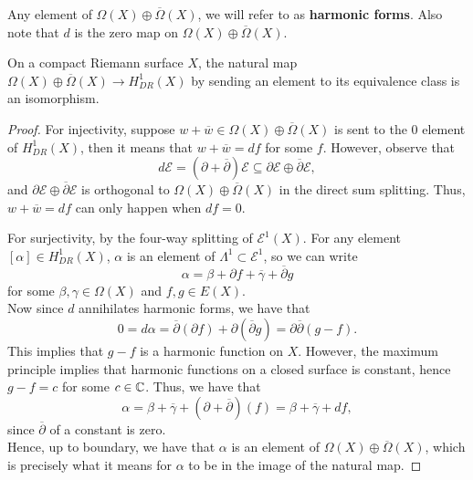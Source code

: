 \documentclass{article}
\begin{document}
{\begin{definition}
Any element of $\Omega(X) \oplus \overline{\Omega}(X)$, we will refer to as \textbf{harmonic forms}. Also note that $d$ is the zero map on $\Omega(X) \oplus \overline{\Omega}(X)$.
\end{definition}

\begin{theorem}
    On a compact Riemann surface $X$, the natural map $\Omega(X) \oplus \overline{\Omega}(X) \to H^1_{DR}(X)$ by sending an element to its equivalence class is an isomorphism.
\end{theorem}

\begin{proof}
    For injectivity, suppose $w + \overline{w} \in \Omega(X) \oplus \overline{\Omega}(X)$ is sent to the $0$ element of $H^1_{DR}(X)$, then it means that $w + \overline{w} = df$ for some $f$. However, observe that
    \[d \mathcal{E} = (\partial + \overline{\partial}) \mathcal{E} \subseteq \partial \mathcal{E} \oplus \overline{\partial } \mathcal{E}, \]
    and $\partial \mathcal{E} \oplus \overline{\partial } \mathcal{E}$ is orthogonal to $\Omega(X) \oplus \overline{\Omega}(X)$ in the direct sum splitting. Thus, $w + \overline{w} = df$ can only happen when $df = 0$.

    For surjectivity, by the four-way splitting of $\mathcal{E}^1(X)$. For any element $[\alpha] \in H^1_{DR}(X)$, $\alpha$ is an element of $\Lambda^1 \subset \mathcal{E}^1$, so we can write
    \[\alpha = \beta + \partial f + \overline{\gamma} + \overline{\partial} g\]
    for some $\beta, \gamma \in \Omega(X)$ and $f, g \in E(X)$.\\

    Now since $d$ annihilates harmonic forms, we have that
    \[0 = d\alpha = \overline{\partial}(\partial f) + \partial(\overline{\partial} g) = \partial \overline{\partial}(g - f). \]
    This implies that $g - f$ is a harmonic function on $X$. However, the maximum principle implies that harmonic functions on a closed surface is constant, hence $g - f = c$ for some $c \in \mathbb{C}$. Thus, we have that
    \[\alpha = \beta + \overline{\gamma} + (\partial + \overline{\partial})(f) = \beta + \overline{\gamma} + df,\]
    since $\overline{\partial}$ of a constant is zero.\\

    Hence, up to boundary, we have that $\alpha$ is an element of $\Omega(X) \oplus \overline{\Omega}(X)$, which is precisely what it means for $\alpha$ to be in the image of the natural map.
\end{proof}

}
\end{document}
